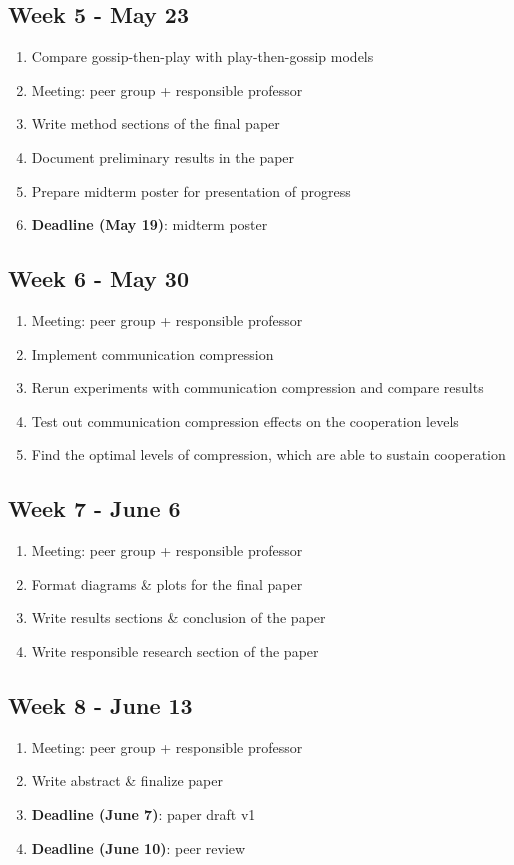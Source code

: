\documentclass[english]{article}
\begin{document}
\subsection*{Week 5 - May 23}
\begin{enumerate}
\item Compare gossip-then-play with play-then-gossip models
\item Meeting: peer group + responsible professor
\item Write method sections of the final paper
\item Document preliminary results in the paper
\item Prepare midterm poster for presentation of progress
\item \textbf{Deadline (May 19)}: midterm poster
\end{enumerate}

\subsection*{Week 6 - May 30}
\begin{enumerate}
\item Meeting: peer group + responsible professor
\item Implement communication compression
\item Rerun experiments with communication compression and compare results
\item Test out communication compression effects on the cooperation levels
\item Find the optimal levels of compression, which are able to sustain cooperation
\end{enumerate}

\subsection*{Week 7 - June 6}
\begin{enumerate}
\item Meeting: peer group + responsible professor
\item Format diagrams \& plots for the final paper
\item Write results sections \& conclusion of the paper
\item Write responsible research section of the paper
\end{enumerate}

\subsection*{Week 8 - June 13}
\begin{enumerate}
\item Meeting: peer group + responsible professor
\item Write abstract \& finalize paper
\item \textbf{Deadline (June 7)}: paper draft v1
\item \textbf{Deadline (June 10)}: peer review
\end{enumerate}
\end{document}
